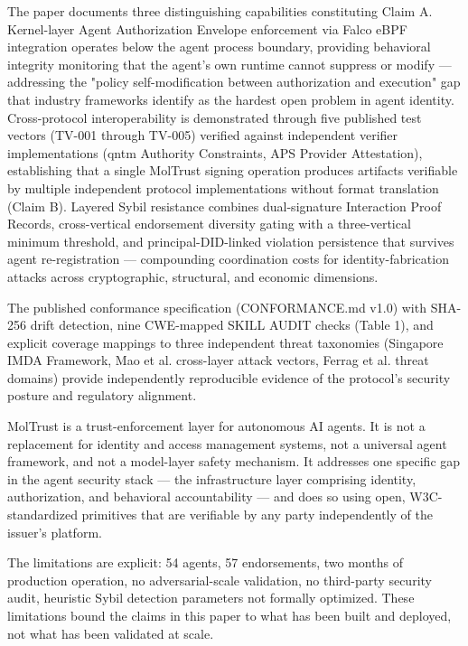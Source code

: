 The paper documents three distinguishing capabilities constituting Claim A. Kernel-layer Agent Authorization Envelope enforcement via Falco eBPF integration operates below the agent process boundary, providing behavioral integrity monitoring that the agent's own runtime cannot suppress or modify — addressing the "policy self-modification between authorization and execution" gap that industry frameworks identify as the hardest open problem in agent identity. Cross-protocol interoperability is demonstrated through five published test vectors (TV-001 through TV-005) verified against independent verifier implementations (qntm Authority Constraints, APS Provider Attestation), establishing that a single MolTrust signing operation produces artifacts verifiable by multiple independent protocol implementations without format translation (Claim B). Layered Sybil resistance combines dual-signature Interaction Proof Records, cross-vertical endorsement diversity gating with a three-vertical minimum threshold, and principal-DID-linked violation persistence that survives agent re-registration — compounding coordination costs for identity-fabrication attacks across cryptographic, structural, and economic dimensions.


The published conformance specification (CONFORMANCE.md v1.0) with SHA-256 drift detection, nine CWE-mapped SKILL AUDIT checks (Table 1), and explicit coverage mappings to three independent threat taxonomies (Singapore IMDA Framework, Mao et al. cross-layer attack vectors, Ferrag et al. threat domains) provide independently reproducible evidence of the protocol's security posture and regulatory alignment.


MolTrust is a trust-enforcement layer for autonomous AI agents. It is not a replacement for identity and access management systems, not a universal agent framework, and not a model-layer safety mechanism. It addresses one specific gap in the agent security stack — the infrastructure layer comprising identity, authorization, and behavioral accountability — and does so using open, W3C-standardized primitives that are verifiable by any party independently of the issuer's platform.


The limitations are explicit: 54 agents, 57 endorsements, two months of production operation, no adversarial-scale validation, no third-party security audit, heuristic Sybil detection parameters not formally optimized. These limitations bound the claims in this paper to what has been built and deployed, not what has been validated at scale.


